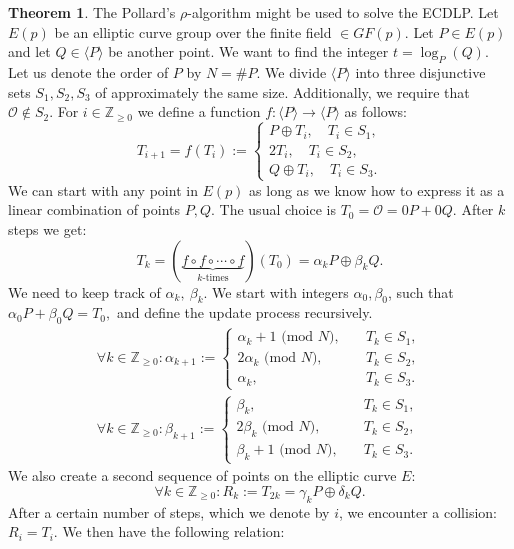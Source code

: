 \documentclass[thesis=M,english]{FITthesis}[2012/10/20]
\theoremstyle{remark}
\theoremstyle{definition}
\newtheorem{theorem}{Theorem}[section]
\begin{document}
 \begin{theorem}
 The Pollard's $\rho$-algorithm might be used to solve the ECDLP. Let $E(p)$ be an elliptic curve group over the finite field $\in GF(p)$. Let $P \in E(p)$ and let $Q \in \langle P \rangle$ be another point. We want to find the integer $t=\log_P(Q)$. Let us denote the order of $P$ by $N = \#P$. We divide $\langle P \rangle$ into three disjunctive sets $S_1, S_2, S_3$ of approximately the same size. Additionally, we require that $\mathcal{O} \not\in S_2$. For $i \in \mathbb{Z}_{\geq 0}$ we define a function $f: \langle P \rangle \to \langle P \rangle$ as follows:
 $$
 T_{i+1} = f(T_i) := \begin{cases} P \oplus T_i,\quad T_i \in S_1, \\
 2T_i, \quad T_i \in S_2, \\
 Q \oplus T_i, \quad T_i \in S_3.
 \end{cases}
 $$
 We can start with any point in $E(p)$ as long as we know how to express it as a linear combination of points $P,Q$. The usual choice is $T_0 = \mathcal{O} = 0P + 0Q$. After $k$ steps we get:
 $$
 T_k = (\underbrace{f\circ f \circ \cdots \circ f}_\text{$k$-times})(T_0) = \alpha_k P \oplus \beta_k Q.
 $$
 We need to keep track of $\alpha_k,\ \beta_k$. We start with integers $\alpha_0, \beta_0$, such that $\alpha_0P + \beta_0Q = T_0,$ and define the update process recursively.
\begin{align*}
 \forall k \in \mathbb{Z}_{\geq 0}:  \alpha_{k+1} := \begin{cases} \alpha_k + 1\text{ (mod $N$)},\quad &T_k \in S_1, \\
 2\alpha_k\text{ (mod $N$)}, \quad &T_k \in S_2, \\
 \alpha_k, \quad &T_k \in S_3.
 \end{cases} \\
   \forall k \in \mathbb{Z}_{\geq 0}: \beta_{k+1} := \begin{cases} \beta_k,\quad &T_k \in S_1, \\
 2\beta_k\text{ (mod $N$)}, \quad &T_k \in S_2, \\
 \beta_k + 1\text{ (mod $N$)}, \quad &T_k \in S_3.
 \end{cases}
 \end{align*}
We also create a second sequence of points on the elliptic curve $E$: 
$$\forall k \in \mathbb{Z}_{\geq 0}: R_k := T_{2k} = \gamma_kP \oplus \delta_kQ.$$
After a certain number of steps, which we denote by $i$, we encounter a collision: $R_i = T_i$. We then have the following relation: 

\end{theorem}
\end{document}

